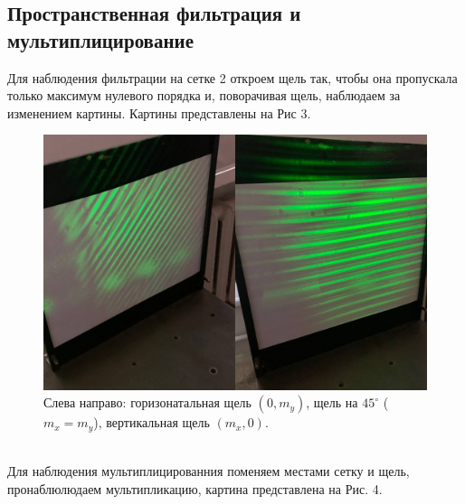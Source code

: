\documentclass[a4paper,12pt]{article}
\begin{document}
\subsection{Пространственная фильтрация и мультиплицирование}
Для наблюдения фильтрации на сетке 2 откроем щель так, чтобы она пропускала только максимум нулевого порядка и, поворачивая щель, наблюдаем за изменением картины. Картины представлены на Рис 3.
\begin{figure}[h]
\includegraphics[scale=0.2]{new.jpg}
\centering
\caption{Слева направо: горизонатальная щель $(0,m_y)$, щель на $45^\circ$ ($m_x = m_y$), вертикальная щель $(m_x,0)$.}
\end{figure}\\
\newpage
Для наблюдения мультиплицированния поменяем местами сетку и щель, пронаблюлюдаем мультипликацию, картина представлена на Рис. 4.
\end{document}
